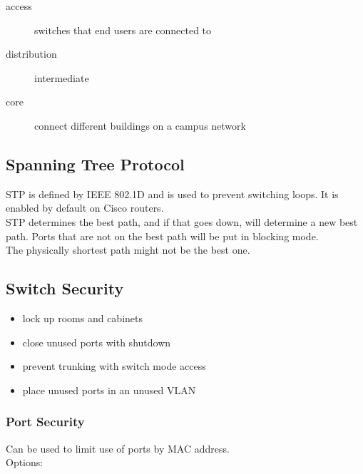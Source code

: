 \begin{description}

\item[access]
switches that end users are connected to

\item[distribution]
intermediate

\item[core]
connect different buildings on a campus network

\end{description}

\subsection{Spanning Tree Protocol}

STP is defined by IEEE 802.1D and is used to prevent switching loops. It is
enabled by default on Cisco routers.\\

STP determines the best path, and if that goes down, will determine a new best
path. Ports that are not on the best path will be put in blocking mode.\\

The physically shortest path might not be the best one.

\subsection{Switch Security}

\begin{itemize}

\item lock up rooms and cabinets
\item close unused ports with shutdown
\item prevent trunking with switch mode access
\item place unused ports in an unused VLAN

\end{itemize}

\subsubsection{Port Security}

Can be used to limit use of ports by MAC address.\\

Options:

